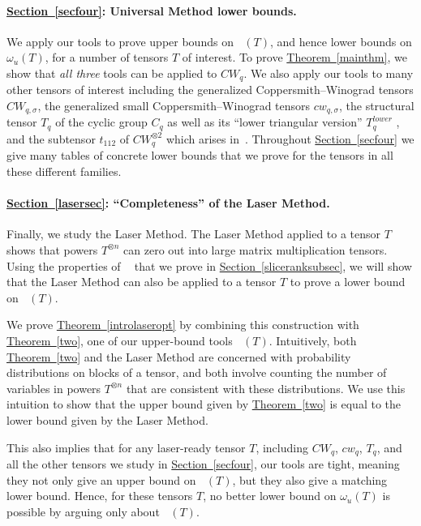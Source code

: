 \documentclass[11pt]{article}
\numberwithin{equation}{section}
\theoremstyle{definition}
\theoremstyle{plain}
\newcommand{\expref}[2]{\hyperref[#2]{#1~\ref{#2}}}
\newcommand{\tsr}{\mathop{\tilde{\operatorname{S}}}}
\theoremstyle{definition}
\begin{document}
%
\paragraph{\expref{Section}{secfour}: Universal Method lower bounds.} We apply our tools to prove upper bounds on $\tsr(T)$, and hence lower bounds on $\omega_u(T)$, for a number of tensors $T$ of interest. To prove \expref{Theorem}{mainthm}, we show that \emph{all three} tools can be applied to $CW_q$. We also apply our tools to many other tensors of interest including the generalized Coppersmith--Winograd tensors $CW_{q,\sigma}$, the generalized small Coppersmith--Winograd tensors $cw_{q,\sigma}$, the structural tensor $T_q$ of the cyclic group $C_q$ as well as its ``lower triangular version'' $T_q^{lower}$ , and the subtensor $t_{112}$ of $CW_q^{\otimes 2}$ which arises
%
in~\cite{coppersmith,stothers,v12,legall,awrefined,legallrect,legallrect2}. 
Throughout \expref{Section}{secfour} we give many tables of concrete lower bounds that we prove for the tensors in all these different families.

\paragraph{\expref{Section}{lasersec}: ``Completeness'' of the Laser Method.} Finally, we study the Laser Method. The Laser Method applied to a tensor $T$ shows that powers $T^{\otimes n}$ can zero out into large matrix multiplication tensors. Using the properties of $\tsr$ that we prove in \expref{Section}{sliceranksubsec}, we will show that the Laser Method can also be applied to a tensor $T$ to prove a lower bound on $\tsr(T)$. %

We prove \expref{Theorem}{introlaseropt} by combining this construction with \expref{Theorem}{two}, one of our 
%
upper-bound tools  %
$\tsr(T)$. Intuitively, both \expref{Theorem}{two} and the Laser Method are concerned with probability distributions on blocks of a tensor, and both involve counting the number of variables in powers $T^{\otimes n}$ that are consistent with these distributions. We use this intuition to show that the upper bound given by \expref{Theorem}{two} is equal to the lower bound given by the Laser Method.

This also implies that for any laser-ready tensor $T$, including $CW_q$, $cw_q$, $T_q$, and all the other tensors we study in \expref{Section}{secfour}, our tools are tight, meaning they not only give an upper bound on $\tsr(T)$, but they also give a matching lower bound. Hence, for these tensors $T$, no better lower bound on $\omega_u(T)$ is possible by arguing only about $\tsr(T)$. 
\end{document}
